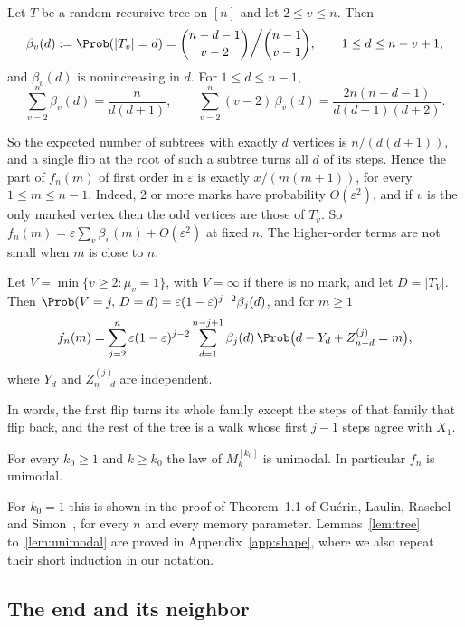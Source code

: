 \begin{lemma}\label{lem:subtree}
Let $T$ be a random recursive tree on $[n]$ and let $2\le v\le n$. Then
\[
 \beta_v(d):=\Prob(\lvert T_v\rvert=d)=\binom{n-d-1}{v-2}\bigg/\binom{n-1}{v-1},
 \qquad 1\le d\le n-v+1,
\]
and $\beta_v(d)$ is nonincreasing in $d$. For $1\le d\le n-1$,
\[
 \sum_{v=2}^n\beta_v(d)=\frac{n}{d(d+1)},\qquad
 \sum_{v=2}^n(v-2)\,\beta_v(d)=\frac{2n(n-d-1)}{d(d+1)(d+2)} .
\]
\end{lemma}

So the expected number of subtrees with exactly $d$ vertices is
$n/(d(d+1))$, and a single flip at the root of such a subtree turns all $d$
of its steps. Hence the part of $f_n(m)$ of first order in $\varepsilon$ is
exactly $x/(m(m+1))$, for every $1\le m\le n-1$. Indeed, 2 or more marks
have probability $O(\varepsilon^2)$, and if $v$ is the only marked vertex
then the odd vertices are those of $T_v$. So
$f_n(m)=\varepsilon\sum_v\beta_v(m)+O(\varepsilon^2)$ at fixed $n$. The
higher-order terms are not small when $m$ is close to $n$.

\begin{lemma}\label{lem:firstmark}
Let $V=\min\{v\ge2:\mu_v=1\}$, with $V=\infty$ if there is no mark, and let
$D=\lvert T_V\rvert$. Then
$\Prob(V=j,\,D=d)=\varepsilon(1-\varepsilon)^{j-2}\beta_j(d)$, and for
$m\ge1$
\[
 f_n(m)=\sum_{j=2}^n\varepsilon(1-\varepsilon)^{j-2}\sum_{d=1}^{n-j+1}
 \beta_j(d)\,\Prob\bigl(d-Y_d+Z^{(j)}_{n-d}=m\bigr),
\]
where $Y_d$ and $Z^{(j)}_{n-d}$ are independent.
\end{lemma}

In words, the first flip turns its whole family except the steps of that
family that flip back, and the rest of the tree is a walk whose first $j-1$
steps agree with $X_1$.

\begin{lemma}\label{lem:unimodal}
For every $k_0\ge1$ and $k\ge k_0$ the law of $M^{[k_0]}_k$ is unimodal.
In particular $f_n$ is unimodal.
\end{lemma}

For $k_0=1$ this is shown in the proof of Theorem~1.1 of Gu\'erin, Laulin,
Raschel and Simon~\cite{glrs2025}, for every $n$ and every memory
parameter. Lemmas~\ref{lem:tree} to~\ref{lem:unimodal} are proved in
Appendix~\ref{app:shape}, where we also repeat their short induction in our
notation.

\subsection{The end and its neighbor}

